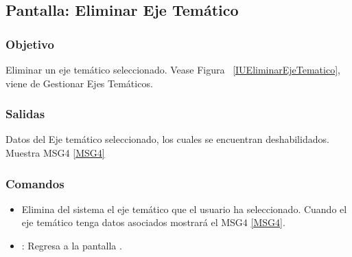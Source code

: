 \subsection{Pantalla: Eliminar Eje Temático}

\subsubsection{Objetivo}
Eliminar un eje temático seleccionado. Vease Figura ~\ref{IUEliminarEjeTematico}, viene de Gestionar Ejes Temáticos.


\subsubsection{Salidas}
Datos del Eje temático seleccionado, los cuales se encuentran deshabilidados.
Muestra MSG4 \ref{MSG4}
\subsubsection{Comandos}
\begin{itemize}
 \item {} Elimina del sistema el eje temático que el usuario ha seleccionado. Cuando el eje temático tenga datos asociados mostrará el MSG4 \ref{MSG4}.
 \item {}: Regresa a la pantalla .
\end{itemize}




